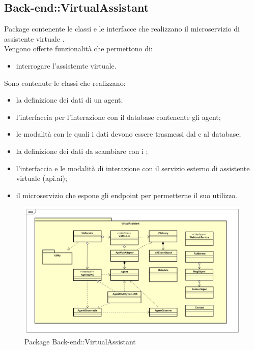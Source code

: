 \subsection{Back-end::VirtualAssistant}
Package contenente le classi e le interfacce che realizzano il microservizio di assistente virtuale .\\ Vengono offerte funzionalità che permettono di: \begin{itemize} \item interrogare l'assistemte virtuale. \end{itemize} Sono contenute le classi che realizzano: \begin{itemize} \item la definizione dei dati di un agent; \item l'interfaccia per l'interazione con il database contenente gli agent; \item le modalità con le quali i dati devono essere trasmessi dal e al database; \item la definizione dei dati da scambiare con i ; \item l'interfaccia e le modalità di interazione con il servizio esterno di assistente virtuale (api.ai); \item il microservizio che espone gli endpoint per permetterne il suo utilizzo. \end{itemize}
\begin{figure}[h] \centering \includegraphics[width=\textwidth,height=\textheight,keepaspectratio]{images/diagrams/back-end/Official_Backend_0304/VirtualAssistant.png}
	\caption{Package Back-end::VirtualAssistant}
\end{figure}
\newpage

